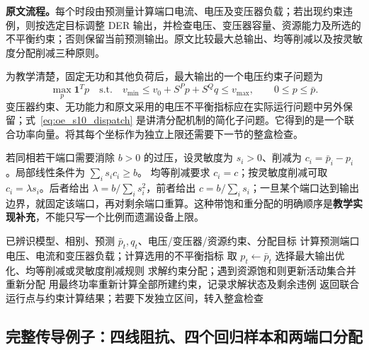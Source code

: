 \textbf{原文流程。}每个时段由预测量计算端口电流、电压及变压器负载；若出现约束违例，则按选定目标调整 DER 输出，并检查电压、变压器容量、资源能力及所选的不平衡约束；否则保留当前预测输出。原文比较最大总输出、均等削减以及按灵敏度分配削减三种原则。

为教学清楚，固定无功和其他负荷后，最大输出的一个电压约束子问题为
\begin{equation}
 \max_p\boldsymbol1^Tp\quad\text{s.t.}\quad
 v_{\min}\le v_0+S^Pp+S^Qq\le v_{\max},\qquad
 0\le p\le\bar p.
 \label{eq:oe_s10_dispatch}
\end{equation}
变压器约束、无功能力和原文采用的电压不平衡指标应在实际运行问题中另外保留；式~\eqref{eq:oe_s10_dispatch} 是讲清分配机制的简化子问题。它得到的是一个联合功率向量。将其每个坐标作为独立上限还需要下一节的整盒检查。

若同相若干端口需要消除 $b>0$ 的过压，设灵敏度为 $s_i>0$、削减为
$c_i=\bar p_i-p_i$。局部线性条件为 $\sum_i s_ic_i\ge b$。
均等削减要求 $c_i=c$；按灵敏度削减可取 $c_i=\lambda s_i$。后者给出
$\lambda=b/\sum_is_i^2$，前者给出 $c=b/\sum_is_i$；一旦某个端口达到输出边界，就固定该端口，再对剩余端口重算。这种带饱和重分配的明确顺序是\textbf{教学实现补充}，不能只写一个比例而遗漏设备上限。

\begin{algorithm}[tbp]
\caption{S10 的逐时段运行链：原算法主线，停止与复检显式化}
\label{alg:oe_s10_allocate}
\begin{algorithmic}[1]
\Require 已辨识模型、相别、预测 $\bar p_t,q_t$、电压/变压器/资源约束、分配目标
 \State 计算预测端口电压、电流和变压器负载；计算选用的不平衡指标
   \State 取 $p_t\gets\bar p_t$
 \Else
   \State 选择最大输出优化、均等削减或灵敏度削减规则
   \State 求解约束分配；遇到资源饱和则更新活动集合并重新分配
   \State 用最终功率重新计算全部所建约束，记录求解状态及剩余违例
 \EndIf
 \State 返回联合运行点与约束计算结果；若要下发独立区间，转入整盒检查
\EndFor
\end{algorithmic}
\end{algorithm}

\subsection{完整传导例子：四线阻抗、四个回归样本和两端口分配}

